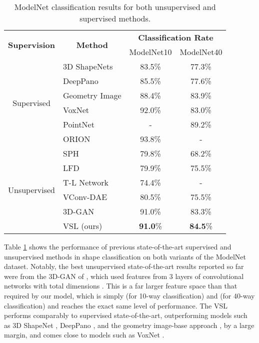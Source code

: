 \documentclass[10pt,twocolumn,letterpaper]{article}
\begin{document}
\begin{table}[ht!]
 \vspace{-0.5em}
  \centering
  \small
  \setlength\tabcolsep{2pt}
    \begin{tabular}{clcc}
    \multirow{2}[0]{*}{{\bf Supervision}} & \multicolumn{1}{c}{\multirow{2}[0]{*}{{\bf Method}}} & \multicolumn{2}{c}{{\bf Classification Rate}} \\
          &       & ModelNet10 & ModelNet40 \\
    \toprule
    \multirow{6}[0]{*}{Supervised} & 3D ShapeNets \cite{wu20153d}  & 83.5\% & 77.3\% \\
          & DeepPano \cite{shi2015deeppano} & 85.5\% &  77.6\% \\
          & Geometry Image \cite{sinha2016deep} & 88.4\% & 83.9\% \\
          & VoxNet \cite{maturana2015voxnet}& 92.0\%  & 83.0\%   \\
          & PointNet \cite{qi2016pointnet} & - & 89.2\% \\
          & ORION \cite{sedaghat2016orientation} &   93.8\%     &  - \\
    \midrule
    \multirow{6}[0]{*}{Unsupervised} & SPH \cite{kazhdan2003rotation}  &  79.8\%  & 68.2\% \\
          & LFD \cite{chen2003visual}  &   79.9\%    & 75.5\% \\          & T-L Network \cite{girdhar2016learning}&   74.4\%  & - \\
          & VConv-DAE \cite{sharma2016vconv} & 80.5\%  &    75.5\%   \\
          & 3D-GAN \cite{wu2016learning}&  91.0\% & 83.3\% \\
          & VSL (ours) &  {\bf 91.0}\%   & {\bf 84.5}\%\\
    \bottomrule
    \end{tabular}\caption{ModelNet classification results for both unsupervised and supervised methods.}
  \label{tab:shapeclass}\vspace{-0.5em}
\end{table}

Table \ref{tab:shapeclass} shows the performance of previous state-of-the-art supervised and unsupervised methods in shape classification on both variants of the ModelNet dataset. Notably, the best unsupervised state-of-the-art results reported so far were from the 3D-GAN of \cite{wu2016learning}, which used features from 3 layers of convolutional networks with total dimensions . This is a far larger feature space than that required by our model, which is simply  (for 10-way classification) and  (for 40-way classification) and reaches the exact same level of performance. The VSL performs comparably to supervised state-of-the-art, outperforming models such as 3D ShapeNet \cite{wu20153d}, DeepPano \cite{shi2015deeppano}, and the geometry image-base approach \cite{sinha2016deep}, by a large margin, and comes close to models such as VoxNet \cite{maturana2015voxnet}.
\end{document}
